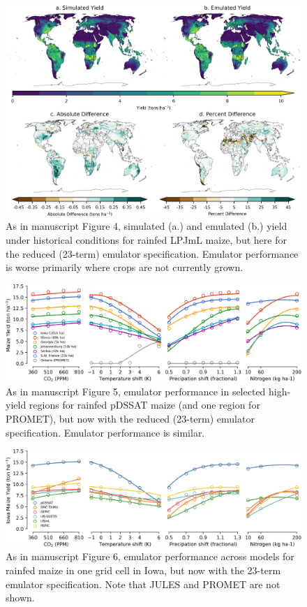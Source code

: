 \documentclass[12pt]{article}
\begin{document}
\vspace{-0.1in}
\begin{figure}[h!]
  \centering
  \includegraphics[width=11.cm]{reduced_lpjml_maize.png}
  \caption{As in manuscript Figure 4,  simulated (a.) and emulated (b.) yield under historical conditions for rainfed LPJmL maize, but here for the reduced (23-term) emulator specification. Emulator performance is worse primarily where crops are not currently grown.}
  \label{fig:reducedlpjml}
\end{figure}

\begin{figure}[h!]
  \centering
  \includegraphics[width=15.5cm]{reduced_regression_example_1.png}
	\caption{As in manuscript Figure 5, emulator performance in selected high-yield regions for rainfed pDSSAT maize (and one region for PROMET), but now with the reduced (23-term) emulator specification. Emulator performance is similar.}
  \label{fig:reducedareas}
\end{figure}

\begin{figure}[h!]
  \centering
  \includegraphics[width=15.5cm]{reduced_regression_example_2.png}
  \caption{As in manuscript Figure 6, emulator performance across models for rainfed maize in one grid cell in Iowa, but now with the 23-term emulator specification. Note that JULES and PROMET are not shown.}
  \label{fig:reducedmodels}
\end{figure}
\end{document}
